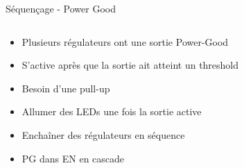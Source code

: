 \begin{frame}{Séquençage - Power Good}
    \begin{columns}
        \begin{column}{0.4\textwidth}
            \vspace{-20pt}
            \begin{itemize}
                \item Plusieurs régulateurs ont une sortie Power-Good
                \item S'active après que la sortie ait atteint un threshold
                \bigskip
                \item Besoin d'une pull-up
                \bigskip
                \item Allumer des LEDs une fois la sortie active
                \item Enchaîner des régulateurs en séquence
                \item PG dans EN en cascade
            \end{itemize}
        \end{column}


\end{columns}
\end{frame}
